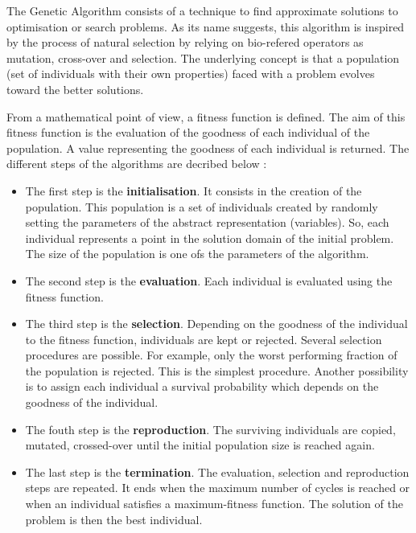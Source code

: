 \documentclass[main.tex]{subfiles}
\begin{document}
\bigskip


\NI The Genetic Algorithm consists of a technique to find approximate solutions to optimisation or search problems. As its name suggests, this algorithm is inspired by the process of natural selection by relying on bio-refered operators as mutation, cross-over and selection. The underlying concept is that a population (set of individuals with their own properties) 
faced with a problem evolves toward the better solutions.


\bigskip


\NI From a mathematical point of view, a fitness function is defined. The aim of this fitness function is the evaluation of the goodness of each individual of the population. A value representing the goodness of each individual is returned. The different steps of the algorithms are decribed below : 


\begin{itemize}
\item The first step is the \textbf{initialisation}. It consists in the creation of the population. This population is a set of individuals created by randomly setting the parameters of the abstract representation (variables). So, each individual represents a point in the solution domain of the initial problem. The size of the population is one ofs the parameters of the algorithm. 

\item The second step is the \textbf{evaluation}. Each individual is evaluated using the fitness function.

\item The third step is the \textbf{selection}. Depending on the goodness of the individual to the fitness function, individuals are kept or rejected. Several selection procedures are possible. For example, only the worst performing fraction of the population is rejected. This is the simplest procedure. Another possibility is to assign each individual a survival probability which depends on the goodness of the individual.

\item The fouth step is the \textbf{reproduction}. The surviving individuals are copied, mutated, crossed-over until the initial population size is reached again.

\item The last step is the \textbf{termination}. The evaluation, selection and reproduction steps are repeated. It ends when the maximum number of cycles is reached or when an individual satisfies a maximum-fitness function. The solution of the problem is then the best individual. 

\end{itemize}  
\end{document}
